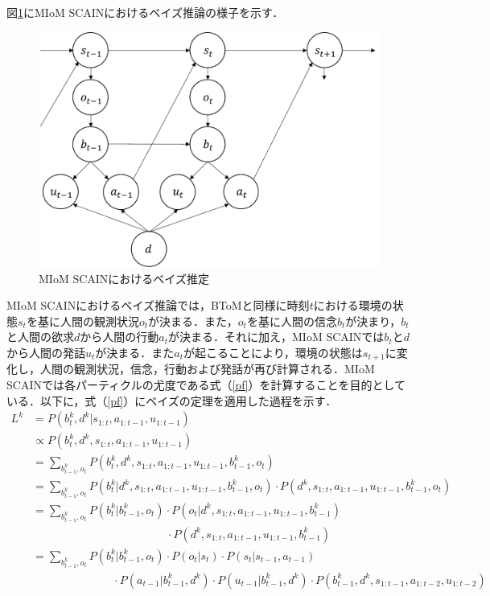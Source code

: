 \par
図\ref{fig:miom}にMIoM SCAINにおけるベイズ推論の様子を示す．
\begin{figure}[htbp]
  \begin{center}
    \includegraphics[scale=0.75]{./miom.pdf}
    \caption{MIoM SCAINにおけるベイズ推定}
    \label{fig:miom}
  \end{center}
\end{figure}
MIoM SCAINにおけるベイズ推論では，BToMと同様に時刻$t$における環境の状態$s_{t}$を基に人間の観測状況$o_{t}$が決まる．また，$o_{t}$を基に人間の信念$b_{t}$が決まり，$b_{t}$と人間の欲求$d$から人間の行動$a_{t}$が決まる．それに加え，MIoM SCAINでは$b_t$と$d$から人間の発話$u_t$が決まる．また$a_{t}$が起こることにより，環境の状態は$s_{t+1}$に変化し，人間の観測状況，信念，行動および発話が再び計算される．MIoM SCAINでは各パーティクルの尤度である式（\ref{pf}）を計算することを目的としている．以下に，式（\ref{pf}）にベイズの定理を適用した過程を示す．
\begin{equation}
  \begin{split}
  \label{eq_miom}
  L^k&=P(b_t^k,d^k|s_{1:t},a_{1:t-1},u_{1:t-1})\\
  &\propto P(b_t^k,d^k,s_{1:t},a_{1:t-1},u_{1:t-1})\\
  &= \sum_{b_{t-1}^k,o_t}P(b_t^k,d^k,s_{1:t},a_{1:t-1},u_{1:t-1},b_{t-1}^k,o_t)\\
  &= \sum_{b_{t-1}^k,o_t}P(b_t^k|d^k,s_{1:t},a_{1:t-1},u_{1:t-1},b_{t-1}^k,o_t)\cdot P(d^k,s_{1:t},a_{1:t-1},u_{1:t-1},b_{t-1}^k,o_t)\\
  &= \sum_{b_{t-1}^k,o_t}P(b_t^k|b_{t-1}^k,o_t)\cdot P(o_t|d^k,s_{1:t},a_{1:t-1},u_{1:t-1},b_{t-1}^k)\\
  &\hspace{5cm} \cdot P(d^k,s_{1:t},a_{1:t-1},u_{1:t-1},b_{t-1}^k)\\
  &= \sum_{b_{t-1}^k,o_t}P(b_t^k|b_{t-1}^k,o_t)\cdot P(o_t|s_t)\cdot P(s_t|s_{t-1},a_{t-1})\\
  &\hspace{3cm} \cdot P(a_{t-1}|b_{t-1}^k,d^k)\cdot P(u_{t-1}|b_{t-1}^k,d^k)\cdot P(b_{t-1}^k,d^k,s_{1:t-1},a_{1:t-2},u_{1:t-2})\\
  \end{split}
\end{equation}
